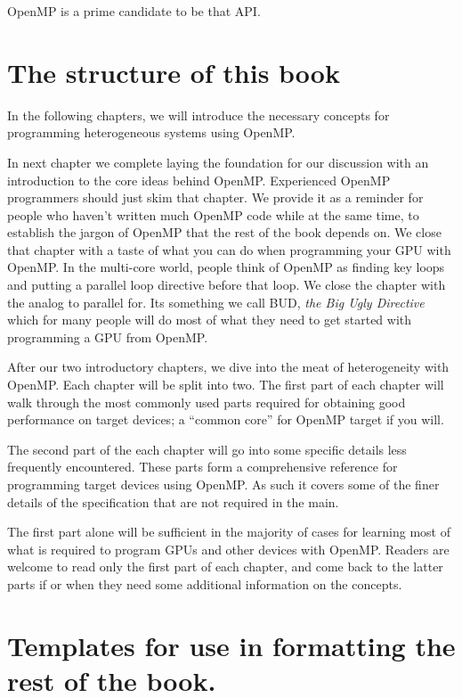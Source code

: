 OpenMP is a prime candidate to be that API.

\section{The structure of this book}

In the following chapters, we will introduce the necessary concepts for programming heterogeneous systems using OpenMP.

In next chapter we complete laying the foundation for our discussion with an introduction to the core ideas behind OpenMP. 
Experienced OpenMP programmers should just skim that chapter.  We provide 
it as a reminder for people who haven't written much OpenMP code while at the
same time, to establish the jargon of OpenMP that the rest of the book depends on.  We close that chapter with
a taste of what you can do when programming your GPU with OpenMP.   In the multi-core world, people think of OpenMP
as finding key loops and putting a parallel loop directive before that loop.  We close the chapter with the analog to parallel for.  
Its something we call BUD, \emph{the Big Ugly Directive} which for many people will do most of what they need to get started
with programming a GPU from OpenMP.

After our two introductory chapters, we dive into the meat of heterogeneity with OpenMP.  
Each chapter will be split into two.
The first part of each chapter will walk through the most commonly used parts required for obtaining 
good performance on target devices; a ``common core'' for OpenMP target if you will.

The second part of the each chapter will go into some specific details less frequently encountered.
These parts form a comprehensive reference for programming target devices using OpenMP.
As such it covers some of the finer details of the specification that are not required in the main.

The first part alone will be sufficient in the majority of cases for learning most of what is required to 
program GPUs and other devices with OpenMP. Readers are welcome to read only the first part of 
each chapter, and come back to the latter parts if or when they need some additional information on the concepts.


\section{Templates for use in formatting the rest of the book.}

